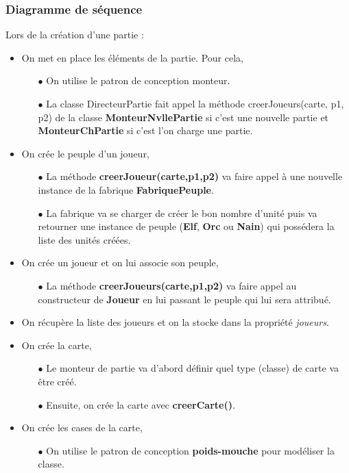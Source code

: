 \documentclass[a4paper,11pt]{article}
\begin{document}
\subsubsection{Diagramme de séquence}
Lors de la création d'une partie :
\begin{itemize}
\item On met en place les éléments de la partie. Pour cela,
	\begin{itemize}
	\item[$\bullet$] On utilise le patron de conception monteur.
	\item[$\bullet$] La classe DirecteurPartie fait appel la méthode creerJoueurs(carte, p1, p2) de la classe \textbf{MonteurNvllePartie} si c'est une nouvelle partie et \textbf{MonteurChPartie} si c'est l'on charge une partie.
	\end{itemize}
\item On crée le peuple d'un joueur,
	\begin{itemize}
	\item[$\bullet$] La méthode \textbf{creerJoueur(carte,p1,p2)} va faire appel à une nouvelle instance de la fabrique \textbf{FabriquePeuple}.
	\item[$\bullet$] La fabrique va se charger de créer le bon nombre d'unité puis va retourner une instance de peuple (\textbf{Elf}, \textbf{Orc} ou \textbf{Nain}) qui possédera la liste des unités créées.
	\end{itemize}
\item On crée un joueur et on lui associe son peuple, 
	\begin{itemize}
	\item[$\bullet$] La méthode \textbf{creerJoueurs(carte,p1,p2)} va faire appel au constructeur de \textbf{Joueur} en lui passant le peuple qui lui sera attribué.
	\end{itemize}
\item On récupère la liste des joueurs et on la stocke dans la propriété \textit{joueurs}.
\item On crée la carte,
	\begin{itemize}
	\item[$\bullet$] Le monteur de partie va d'abord définir quel type (classe) de carte va être créé.
	\item[$\bullet$]  Ensuite, on crée la carte avec \textbf{creerCarte()}.
	\end{itemize}
\item On crée les cases de la carte,
	\begin{itemize}
	\item[$\bullet$] On utilise le patron de conception \textbf{poids-mouche} pour modéliser la classe.

\end{itemize}
\end{itemize}
\end{document}
